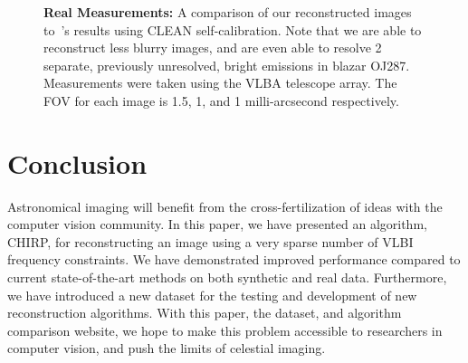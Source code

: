 \begin{figure}[tb]
\begin{center}
\begin{tabular}{  c | c | c | c   }
			
		\end{tabular}
		\caption{ \footnotesize{{\bf Real Measurements:} A comparison of our reconstructed images to~\cite{jorstad2005polarimetric}'s results using CLEAN self-calibration. Note that we are able to reconstruct less blurry images, and are even able to resolve 2 separate, previously unresolved, bright emissions in blazar OJ287. Measurements were taken using the VLBA telescope array. The FOV for each image is 1.5, 1, and 1 milli-arcsecond respectively.} }
		\label{fig:realdata}
		\vspace{-.3in}
	\end{center}
\end{figure}


\section{Conclusion}
Astronomical imaging will benefit from the cross-fertilization of ideas with the computer vision community. 
In this paper, we have presented an algorithm, CHIRP, for reconstructing an image using a very sparse number of VLBI frequency constraints.
We have demonstrated improved performance compared to current state-of-the-art methods on both synthetic and real data.
Furthermore, we have introduced a new dataset for the testing and
development of new reconstruction algorithms.  
With this paper, the
dataset, and algorithm comparison website, we hope to make this
problem accessible to researchers in computer vision, and push the limits of celestial imaging. 



